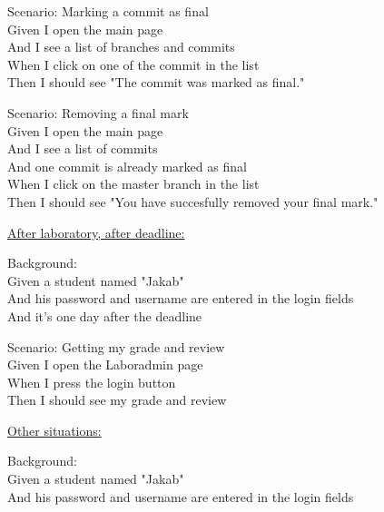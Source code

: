 Scenario: Marking a commit as final\\ \hspace*{1cm}
Given I open the main page\\ \hspace*{1cm}
And I see a list of branches and commits\\ \hspace*{1cm}
When I click on one of the commit in the list\\ \hspace*{1cm}
Then I should see "The commit was marked as final."

Scenario: Removing a final mark\\ \hspace*{1cm}
Given I open the main page\\ \hspace*{1cm}
And I see a list of commits\\ \hspace*{1cm}
And one commit is already marked as final\\ \hspace*{1cm}
When I click on the master branch in the list\\ \hspace*{1cm}
Then I should see "You have succesfully removed your final mark."



\underline{After laboratory, after deadline:}

Background:\\ \hspace*{1cm}
Given a student named "Jakab"\\ \hspace*{1cm}
And his password and username are entered in the login fields\\ \hspace*{1cm}
And it's one day after the deadline

Scenario: Getting my grade and review\\ \hspace*{1cm}
Given I open the Laboradmin page\\ \hspace*{1cm}
When I press the login button\\ \hspace*{1cm}
Then I should see my grade and review



\underline{Other situations:}

Background:\\ \hspace*{1cm}
Given a student named "Jakab"\\ \hspace*{1cm}
And his password and username are entered in the login fields

